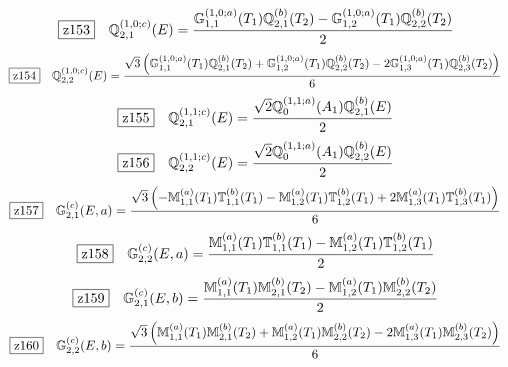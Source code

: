 \documentclass[fleqn,10pt,landscape]{jsarticle}
\begin{document}
\begin{dmath*}
\hspace*{3mm}\fbox{z153}\quad \mathbb{Q}_{2,1}^{(1,0;c)}(E)=\frac{\mathbb{G}_{1,1}^{(1,0;a)}(T_{1}) \mathbb{Q}_{2,1}^{(b)}(T_{2}) - \mathbb{G}_{1,2}^{(1,0;a)}(T_{1}) \mathbb{Q}_{2,2}^{(b)}(T_{2})}{2}
\end{dmath*}
\begin{dmath*}
\hspace*{3mm}\fbox{z154}\quad \mathbb{Q}_{2,2}^{(1,0;c)}(E)=\frac{\sqrt{3} \left(\mathbb{G}_{1,1}^{(1,0;a)}(T_{1}) \mathbb{Q}_{2,1}^{(b)}(T_{2}) + \mathbb{G}_{1,2}^{(1,0;a)}(T_{1}) \mathbb{Q}_{2,2}^{(b)}(T_{2}) - 2 \mathbb{G}_{1,3}^{(1,0;a)}(T_{1}) \mathbb{Q}_{2,3}^{(b)}(T_{2})\right)}{6}
\end{dmath*}
\begin{dmath*}
\hspace*{3mm}\fbox{z155}\quad \mathbb{Q}_{2,1}^{(1,1;c)}(E)=\frac{\sqrt{2} \mathbb{Q}_{0}^{(1,1;a)}(A_{1}) \mathbb{Q}_{2,1}^{(b)}(E)}{2}
\end{dmath*}
\begin{dmath*}
\hspace*{3mm}\fbox{z156}\quad \mathbb{Q}_{2,2}^{(1,1;c)}(E)=\frac{\sqrt{2} \mathbb{Q}_{0}^{(1,1;a)}(A_{1}) \mathbb{Q}_{2,2}^{(b)}(E)}{2}
\end{dmath*}
\begin{dmath*}
\hspace*{3mm}\fbox{z157}\quad \mathbb{G}_{2,1}^{(c)}(E,a)=\frac{\sqrt{3} \left(- \mathbb{M}_{1,1}^{(a)}(T_{1}) \mathbb{T}_{1,1}^{(b)}(T_{1}) - \mathbb{M}_{1,2}^{(a)}(T_{1}) \mathbb{T}_{1,2}^{(b)}(T_{1}) + 2 \mathbb{M}_{1,3}^{(a)}(T_{1}) \mathbb{T}_{1,3}^{(b)}(T_{1})\right)}{6}
\end{dmath*}
\begin{dmath*}
\hspace*{3mm}\fbox{z158}\quad \mathbb{G}_{2,2}^{(c)}(E,a)=\frac{\mathbb{M}_{1,1}^{(a)}(T_{1}) \mathbb{T}_{1,1}^{(b)}(T_{1}) - \mathbb{M}_{1,2}^{(a)}(T_{1}) \mathbb{T}_{1,2}^{(b)}(T_{1})}{2}
\end{dmath*}
\begin{dmath*}
\hspace*{3mm}\fbox{z159}\quad \mathbb{G}_{2,1}^{(c)}(E,b)=\frac{\mathbb{M}_{1,1}^{(a)}(T_{1}) \mathbb{M}_{2,1}^{(b)}(T_{2}) - \mathbb{M}_{1,2}^{(a)}(T_{1}) \mathbb{M}_{2,2}^{(b)}(T_{2})}{2}
\end{dmath*}
\begin{dmath*}
\hspace*{3mm}\fbox{z160}\quad \mathbb{G}_{2,2}^{(c)}(E,b)=\frac{\sqrt{3} \left(\mathbb{M}_{1,1}^{(a)}(T_{1}) \mathbb{M}_{2,1}^{(b)}(T_{2}) + \mathbb{M}_{1,2}^{(a)}(T_{1}) \mathbb{M}_{2,2}^{(b)}(T_{2}) - 2 \mathbb{M}_{1,3}^{(a)}(T_{1}) \mathbb{M}_{2,3}^{(b)}(T_{2})\right)}{6}
\end{dmath*}
\end{document}
